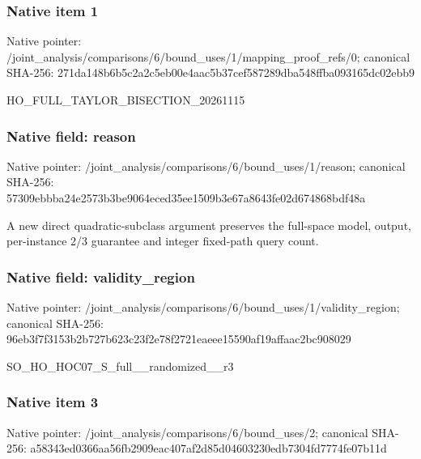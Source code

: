 \documentclass[10pt,a4paper]{article}
\begin{document}
\subsubsection{Native item 1}
Native pointer: /joint\_\allowbreak{}analysis/comparisons/6/bound\_\allowbreak{}uses/1/mapping\_\allowbreak{}proof\_\allowbreak{}refs/0; canonical SHA-256: 271da148b6b5c2a2c5eb00e4aac5b37cef587289dba548ffba093165dc02ebb9

\begingroup\raggedright\sloppy HO\_\allowbreak{}FULL\_\allowbreak{}TAYLOR\_\allowbreak{}BISECTION\_\allowbreak{}20261115\par\endgroup

\subsubsection{Native field: reason}
Native pointer: /joint\_\allowbreak{}analysis/comparisons/6/bound\_\allowbreak{}uses/1/reason; canonical SHA-256: 57309ebbba24e2573b3be9064eced35ee1509b3e67a8643fe02d674868bdf48a

\begingroup\raggedright\sloppy A new direct quadratic-subclass argument preserves the full-space model,\allowbreak{} output,\allowbreak{} per-instance 2/\allowbreak{}3 guarantee and integer fixed-path query count.\par\endgroup

\subsubsection{Native field: validity\_\allowbreak{}region}
Native pointer: /joint\_\allowbreak{}analysis/comparisons/6/bound\_\allowbreak{}uses/1/validity\_\allowbreak{}region; canonical SHA-256: 96eb3f7f3153b2b727b623c23f2e78f2721eaeee15590af19affaac2bc908029

\begingroup\raggedright\sloppy SO\_\allowbreak{}HO\_\allowbreak{}HOC07\_\allowbreak{}S\_\allowbreak{}full\_\allowbreak{}\_\allowbreak{}randomized\_\allowbreak{}\_\allowbreak{}r3\par\endgroup

\subsubsection{Native item 3}
Native pointer: /joint\_\allowbreak{}analysis/comparisons/6/bound\_\allowbreak{}uses/2; canonical SHA-256: a58343ed0366aa56fb2909eac407af2d85d04603230edb7304fd7774fe07b11d
\end{document}
